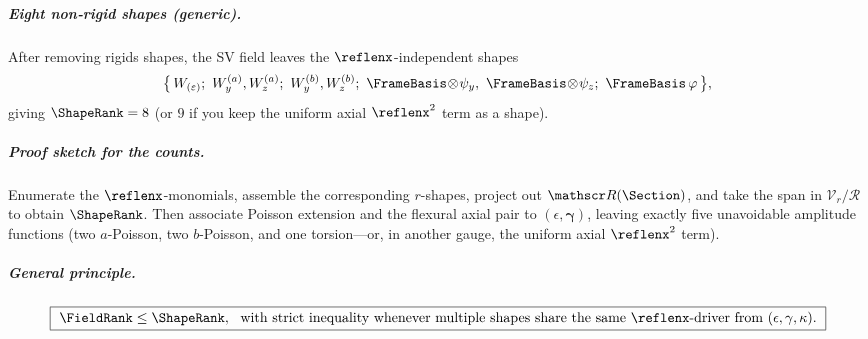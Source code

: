 \subparagraph{Eight non‑rigid shapes (generic).}
After removing rigids shapes, the SV field leaves the \(\reflenx\)-independent shapes
\[
\big\{\,W_{(\varepsilon)};\ W^{(a)}_y,W^{(a)}_z;\ W^{(b)}_y,W^{(b)}_z;\ \FrameBasis\!\otimes\!\psi_y,\ \FrameBasis\!\otimes\!\psi_z;\ \FrameBasis\,\varphi\,\big\},
\]
giving \(\ShapeRank=8\) (or \(9\) if you keep the uniform axial \(\reflenx^2\) term as a shape).

\subparagraph{Proof sketch for the counts.}
Enumerate the \(\reflenx\)-monomials, assemble the corresponding \(r\)-shapes, project out \(\mathscr R(\Section)\), and take the span in \(\mathcal{V}_r/\mathscr R\) to obtain \(\ShapeRank\).
Then associate Poisson extension and the flexural axial pair to \((\epsilon,\bm\gamma)\), leaving exactly five unavoidable amplitude functions (two \(a\)-Poisson, two \(b\)-Poisson, and one torsion—or, in another gauge, the uniform axial \(\reflenx^2\) term).

\subparagraph{General principle.}
\[
\boxed{\ \FieldRank \le \ShapeRank,\ \ \text{with strict inequality whenever multiple shapes share the same \(\reflenx\)-driver from }(\epsilon,\gamma,\kappa). \ }
\]
